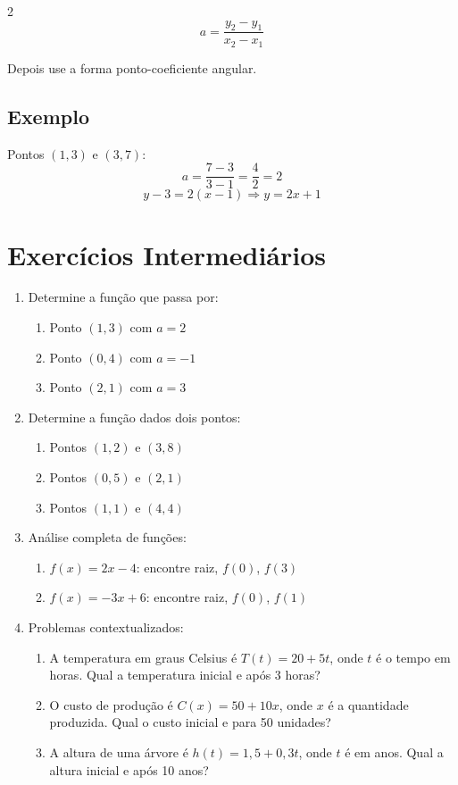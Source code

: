 \documentclass[11pt]{article}
\begin{document}
\begin{multicols}{2}
\[
a = \frac{y_2 - y_1}{x_2 - x_1}
\]

Depois use a forma ponto-coeficiente angular.

\subsection*{Exemplo}
Pontos $(1, 3)$ e $(3, 7)$:
\[
a = \frac{7 - 3}{3 - 1} = \frac{4}{2} = 2
\]
\[
y - 3 = 2(x - 1) \Rightarrow y = 2x + 1
\]

\section*{Exercícios Intermediários}

\begin{enumerate}[leftmargin=*, start=5]

\item Determine a função que passa por:
\begin{enumerate}[label=\alph*)]
\item Ponto $(1, 3)$ com $a = 2$
\item Ponto $(0, 4)$ com $a = -1$
\item Ponto $(2, 1)$ com $a = 3$
\end{enumerate}

\item Determine a função dados dois pontos:
\begin{enumerate}[label=\alph*)]
\item Pontos $(1, 2)$ e $(3, 8)$
\item Pontos $(0, 5)$ e $(2, 1)$
\item Pontos $(1, 1)$ e $(4, 4)$
\end{enumerate}

\item Análise completa de funções:
\begin{enumerate}[label=\alph*)]
\item $f(x) = 2x - 4$: encontre raiz, $f(0)$, $f(3)$
\item $f(x) = -3x + 6$: encontre raiz, $f(0)$, $f(1)$
\end{enumerate}

\item Problemas contextualizados:
\begin{enumerate}[label=\alph*)]
\item A temperatura em graus Celsius é $T(t) = 20 + 5t$, onde $t$ é o tempo em horas. Qual a temperatura inicial e após 3 horas?
\item O custo de produção é $C(x) = 50 + 10x$, onde $x$ é a quantidade produzida. Qual o custo inicial e para 50 unidades?
\item A altura de uma árvore é $h(t) = 1,5 + 0,3t$, onde $t$ é em anos. Qual a altura inicial e após 10 anos?
\end{enumerate}


\end{enumerate}
\end{multicols}
\end{document}
